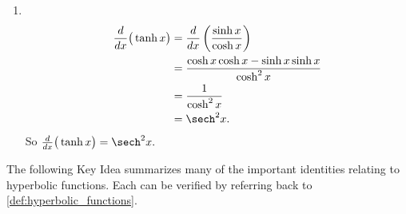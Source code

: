 {\begin{enumerate}
\item  \mbox{}\\[-3\baselineskip]
\begin{align*}
	\frac{d}{dx}\big(\tanh x\big)
	&= \frac{d}{dx}\left(\frac{\sinh x}{\cosh x}\right) \\
	&= \frac{\cosh x \cosh x - \sinh x \sinh x}{\cosh^2 x}\\
	&= \frac{1}{\cosh^2 x}\\
	&= \sech^2 x.
\end{align*}
So $\frac{d}{dx}\big(\tanh x\big) = \sech^2 x.$\eoehere
\end{enumerate}}

The following Key Idea summarizes many of the important identities relating to hyperbolic functions. Each can be verified by referring back to \autoref{def:hyperbolic_functions}.

